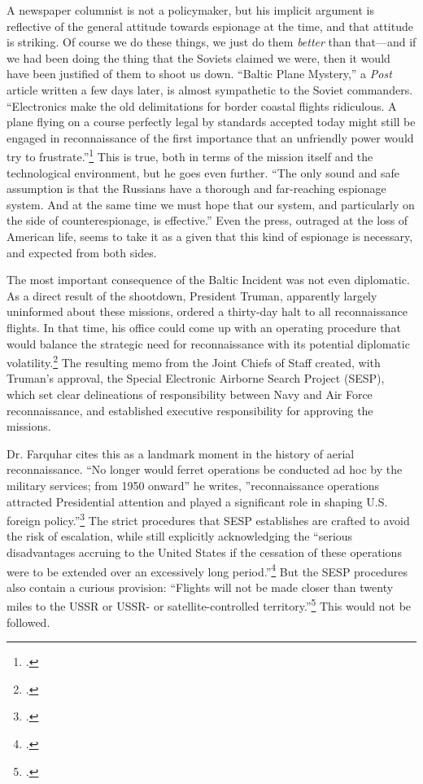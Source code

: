 \documentclass[12pt]{article}
\begin{document}
A newspaper columnist is not a policymaker, but his implicit argument is reflective of the general attitude towards espionage at the time, and that attitude is striking. Of course we do these things, we just do them \emph{better} than that---and if we had been doing the thing that the Soviets claimed we were, then it would have been justified of them to shoot us down. ``Baltic Plane Mystery,'' a \emph{Post} article written a few days later, is almost sympathetic to the Soviet commanders. ``Electronics make the old delimitations for border coastal flights ridiculous. A plane flying on a course perfectly legal by standards accepted today might still be engaged in reconnaissance of the first importance that an unfriendly power would try to frustrate.''\footcite{childs_baltic_1950} This is true, both in terms of the mission itself and the technological environment, but he goes even further. ``The only sound and safe assumption is that the Russians have a thorough and far-reaching espionage system. And at the same time we must hope that our system, and particularly on the side of counterespionage, is effective.'' Even the press, outraged at the loss of American life, seems to take it as a given that this kind of espionage is necessary, and expected from both sides.

The most important consequence of the Baltic Incident was not even diplomatic. As a direct result of the shootdown, President Truman, apparently largely uninformed about these missions, ordered a thirty-day halt to all reconnaissance flights. In that time, his office could come up with an operating procedure that would balance the strategic need for reconnaissance with its potential diplomatic volatility.\footcite[p.~41]{farquhar_aerial_2015} The resulting memo from the Joint Chiefs of Staff created, with Truman's approval, the Special Electronic Airborne Search Project (SESP), which set clear delineations of responsibility between Navy and Air Force reconnaissance, and established executive responsibility for approving the missions.

Dr. Farquhar cites this as a landmark moment in the history of aerial reconnaissance. ``No longer would ferret operations be conducted ad hoc by the military services; from 1950 onward'' he writes, ''reconnaissance operations attracted Presidential attention and played a significant role in shaping U.S. foreign policy.''\footcite[p.~42]{farquhar_aerial_2015} The strict procedures that SESP establishes are crafted to avoid the risk of escalation, while still explicitly acknowledging the ``serious disadvantages accruing to the United States if the cessation of these operations were to be extended over an excessively long period.''\footcite{bradley_memorandum_1950} But the SESP procedures also contain a curious provision: ``Flights will not be made closer than twenty miles to the USSR or USSR- or satellite-controlled territory.''\footcite{bradley_memorandum_1950} This would not be followed.
\end{document}

